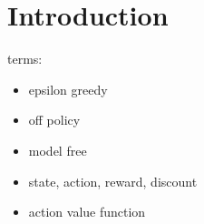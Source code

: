 \section{Introduction}

terms:

\begin{itemize}
\item epsilon greedy
\item off policy
\item model free
\item state, action, reward, discount
\item action value function

\citep{mnih2013}
\end{itemize}
